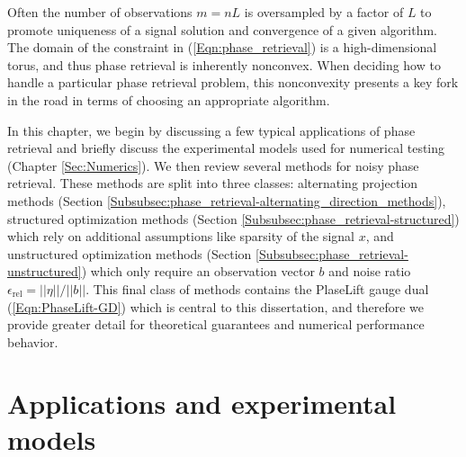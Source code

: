 \begin{enumerate}
Often the number of observations $m = nL$ is oversampled by a factor of $L$ to promote uniqueness of a signal solution and convergence of a given algorithm.  The domain of the constraint in (\ref{Eqn:phase_retrieval}) is a high-dimensional torus, and thus phase retrieval is inherently nonconvex.  When deciding how to handle a particular phase retrieval problem, this nonconvexity presents a key fork in the road in terms of choosing an appropriate algorithm.  


In this chapter, we begin by discussing a few typical applications of phase retrieval and briefly discuss the experimental models used for numerical testing (Chapter \ref{Sec:Numerics}).  We then review several methods for noisy phase retrieval.  These methods are split into three classes: alternating projection methods (Section \ref{Subsubsec:phase_retrieval-alternating_direction_methods}), structured optimization methods (Section \ref{Subsubsec:phase_retrieval-structured}) which rely on additional assumptions like sparsity of the signal $x$, and unstructured optimization methods (Section \ref{Subsubsec:phase_retrieval-unstructured}) which only require an observation vector $b$ and noise ratio $\epsilon_{\text{rel}} = ||\eta|| / ||b||$.  This final class of methods contains the PlaseLift gauge dual (\ref{Eqn:PhaseLift-GD}) which is central to this dissertation, and therefore we provide greater detail for theoretical guarantees and numerical performance behavior.






\end{enumerate}







\section{Applications and experimental models} 			\label{Subsec:phase_retrieval-applications}

